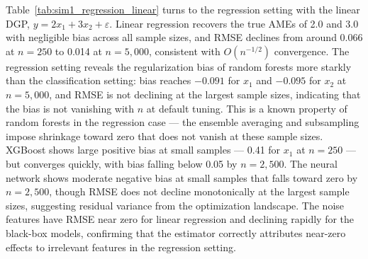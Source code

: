 \documentclass[12pt]{article}
\begin{document}
	Table~\ref{tab:sim1_regression_linear} turns to the regression setting with the linear DGP, $y = 2x_1 + 3x_2 + \varepsilon$. Linear regression recovers the true AMEs of 2.0 and 3.0 with negligible bias across all sample sizes, and RMSE declines from around 0.066 at $n=250$ to 0.014 at $n=5{,}000$, consistent with $O(n^{-1/2})$ convergence. The regression setting reveals the regularization bias of random forests more starkly than the classification setting: bias reaches $-0.091$ for $x_1$ and $-0.095$ for $x_2$ at $n=5{,}000$, and RMSE is not declining at the largest sample sizes, indicating that the bias is not vanishing with $n$ at default tuning. This is a known property of random forests in the regression case --- the ensemble averaging and subsampling impose shrinkage toward zero that does not vanish at these sample sizes. XGBoost shows large positive bias at small samples --- 0.41 for $x_1$ at $n=250$ --- but converges quickly, with bias falling below 0.05 by $n=2{,}500$. The neural network shows moderate negative bias at small samples that falls toward zero by $n=2{,}500$, though RMSE does not decline monotonically at the largest sample sizes, suggesting residual variance from the optimization landscape. The noise features have RMSE near zero for linear regression and declining rapidly for the black-box models, confirming that the estimator correctly attributes near-zero effects to irrelevant features in the regression setting.
	
\end{document}
